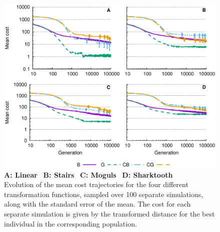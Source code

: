 \documentclass[a4paper,12pt]{article}
\theoremstyle{plain}
\theoremstyle{definition}
\begin{document}
   \begin{figure}[p]
      \hspace{-.5cm}
      \includegraphics[trim=0 5.4cm 4cm 0,width=.9\textwidth]{multievoltest} %
      \caption{\textbf{A: Linear} \ \textbf{B: Stairs} \ \textbf{C:
      Moguls} \ \textbf{D: Sharktooth}\\
      Evolution of the mean cost trajectories for the four different transformation
      functions, sampled over 100 separate simulations, along with the  
      standard error of the mean. The cost for each separate simulation is given by the 
      transformed distance for the best individual in the corresponding population.
      }
      \label{fig:evol_trajectories}
   \end{figure}
  
   \newpage
\end{document}
